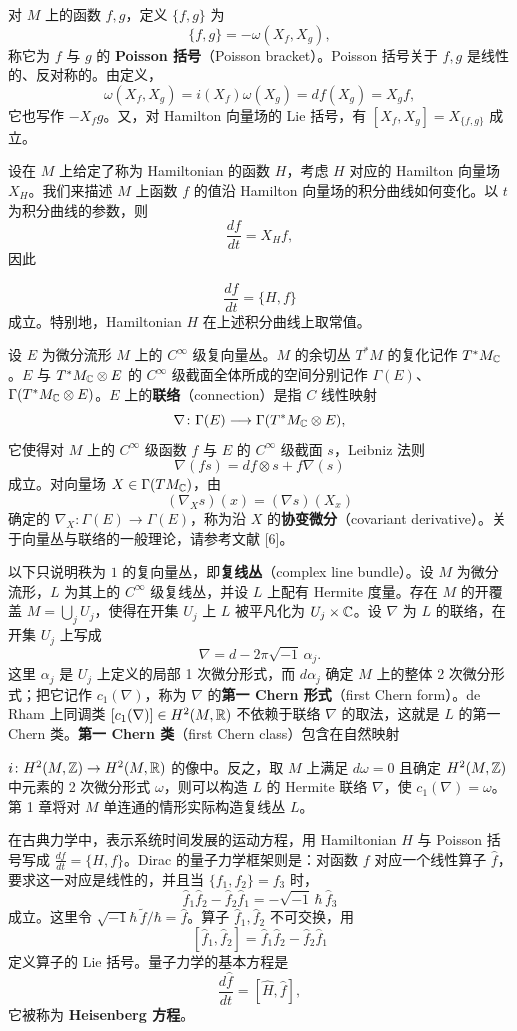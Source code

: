 对 $M$ 上的函数 $f,g$，定义 $\{f,g\}$ 为
\[
  \{f,g\}=-\omega(X_f,X_g),
\]
称它为 $f$ 与 $g$ 的 \textbf{Poisson 括号}（Poisson bracket）。Poisson 括号关于 $f,g$ 是线性的、反对称的。由定义，
\[
  \omega(X_f,X_g)=i(X_f)\omega(X_g)=df(X_g)=X_g f,
\]
它也写作 $-X_f g$。又，对 Hamilton 向量场的 Lie 括号，有 $[X_f,X_g]=X_{\{f,g\}}$ 成立。

设在 $M$ 上给定了称为 Hamiltonian 的函数 $H$，考虑 $H$ 对应的 Hamilton 向量场 $X_H$。我们来描述 $M$ 上函数 $f$ 的值沿 Hamilton 向量场的积分曲线如何变化。以 $t$ 为积分曲线的参数，则
\[
  \frac{df}{dt}=X_H f,
\]
因此

\[
  \frac{df}{dt}=\{H,f\}
\]
成立。特别地，Hamiltonian $H$ 在上述积分曲线上取常值。

设 $E$ 为微分流形 $M$ 上的 $C^{\infty}$ 级复向量丛。$M$ 的余切丛 $T^{*}M$ 的复化记作 $T^{*}M_{\mathbb{C}}$。$E$ 与 $T^{*}M_{\mathbb{C}}\otimes E$ 的 $C^{\infty}$ 级截面全体所成的空间分别记作 $\Gamma(E)$、$\Gamma(T^{*}M_{\mathbb{C}}\otimes E)$。$E$ 上的\textbf{联络}（connection）是指 $C$ 线性映射
\[
  \nabla\colon \Gamma(E)\longrightarrow \Gamma(T^{*}M_{\mathbb{C}}\otimes E),
\]
它使得对 $M$ 上的 $C^{\infty}$ 级函数 $f$ 与 $E$ 的 $C^{\infty}$ 级截面 $s$，Leibniz 法则
\[
  \nabla(fs)=df\otimes s+f\nabla(s)
\]
成立。对向量场 $X\in\Gamma(TM_{\mathbb{C}})$，由
\[
  (\nabla_X s)(x)=(\nabla s)(X_x)
\]
确定的 $\nabla_X\colon \Gamma(E)\to\Gamma(E)$，称为沿 $X$ 的\textbf{协变微分}（covariant derivative）。关于向量丛与联络的一般理论，请参考文献 [6]。

以下只说明秩为 $1$ 的复向量丛，即\textbf{复线丛}（complex line bundle）。设 $M$ 为微分流形，$L$ 为其上的 $C^{\infty}$ 级复线丛，并设 $L$ 上配有 Hermite 度量。存在 $M$ 的开覆盖 $M=\bigcup_{j}U_j$，使得在开集 $U_j$ 上 $L$ 被平凡化为 $U_j\times\mathbb{C}$。设 $\nabla$ 为 $L$ 的联络，在开集 $U_j$ 上写成
\[
  \nabla=d-2\pi\sqrt{-1}\,\alpha_j .
\]
这里 $\alpha_j$ 是 $U_j$ 上定义的局部 1 次微分形式，而 $d\alpha_j$ 确定 $M$ 上的整体 2 次微分形式；把它记作 $c_1(\nabla)$，称为 $\nabla$ 的\textbf{第一 Chern 形式}（first Chern form）。de Rham 上同调类 $[c_1(\nabla)]\in H^{2}(M,\mathbb{R})$ 不依赖于联络 $\nabla$ 的取法，这就是 $L$ 的第一 Chern 类。\textbf{第一 Chern 类}（first Chern class）包含在自然映射

$i\colon H^{2}(M,\mathbb{Z})\to H^{2}(M,\mathbb{R})$ 的像中。反之，取 $M$ 上满足 $d\omega=0$ 且确定 $H^{2}(M,\mathbb{Z})$ 中元素的 2 次微分形式 $\omega$，则可以构造 $L$ 的 Hermite 联络 $\nabla$，使 $c_1(\nabla)=\omega$。第 1 章将对 $M$ 单连通的情形实际构造复线丛 $L$。

在古典力学中，表示系统时间发展的运动方程，用 Hamiltonian $H$ 与 Poisson 括号写成 $\frac{df}{dt}=\{H,f\}$。Dirac 的量子力学框架则是：对函数 $f$ 对应一个线性算子 $\hat f$，要求这一对应是线性的，并且当 $\{f_1,f_2\}=f_3$ 时，
\[
  \hat f_1\hat f_2-\hat f_2\hat f_1=-\sqrt{-1}\,\hbar\,\hat f_3
\]
成立。这里令 $\sqrt{-1}\hbar\,\tilde f/\hbar=\hat f$。算子 $\hat f_1,\hat f_2$ 不可交换，用
\[
  [\hat f_1,\hat f_2]=\hat f_1\hat f_2-\hat f_2\hat f_1
\]
定义算子的 Lie 括号。量子力学的基本方程是
\[
  \frac{d\hat f}{dt}=[\hat H,\hat f],
\]
它被称为 \textbf{Heisenberg 方程}。


